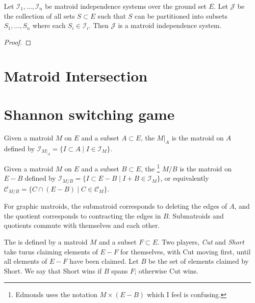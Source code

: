 \documentclass{article}
\newcommand*{\I}[0]{\mathcal{I}}
\newcommand*{\Cc}[0]{\mathcal{C}}
\begin{document}
\begin{theorem}
  Let $\I_1, \dots, \I_n$ be matroid independence systems over the ground set $E$.
  Let $\mathcal{J}$ be the collection of all sets $S \subset E$ such that
  $S$ can be partitioned into subsets $S_1, \dots, S_n$ where each $S_i \in \I_i$.
  Then $\mathcal{J}$ is a matroid independence system.
\end{theorem}
\begin{proof}
  
\end{proof}

\section*{Matroid Intersection}

\section*{Shannon switching game}

\begin{definition}
  Given a matroid $M$ on $E$ and a subset $A \subset E$, the  $M|_A$ is the matroid on $A$ defined by $\I_{M|_A} = \{I \subset A \mid I \in \I_M\}$.
\end{definition}

\begin{definition}
  Given a matroid $M$ on $E$ and a subset $B \subset E$, the \footnote{Edmonds uses the notation $M \times (E - B)$ which I feel is confusing.} $M/B$ is the matroid on $E - B$ defined by $\I_{M/B} = \{I \subset E - B \mid I + B \in \I_M\}$, or equivalently $\Cc_{M/B} = \{C \cap (E - B) \mid C \in \Cc_M\}$.
\end{definition}

For graphic matroids, the submatroid corresponds to deleting the edges of $A$, and the quotient corresponds to contracting the edges in $B$.  Submatroids and quotients commute with themselves and each other.

\begin{definition}
  The  is defined by a matroid $M$ and a subset $F \subset E$.
  Two players, \emph{Cut} and \emph{Short} take turns claiming elements of $E - F$ for themselves, with Cut moving first, until all elements of $E - F$ have been claimed.
  Let $B$ be the set of elements claimed by Short.
  We say that Short wins if $B$ spans $F$; otherwise Cut wins.
\end{definition}

\end{document}
